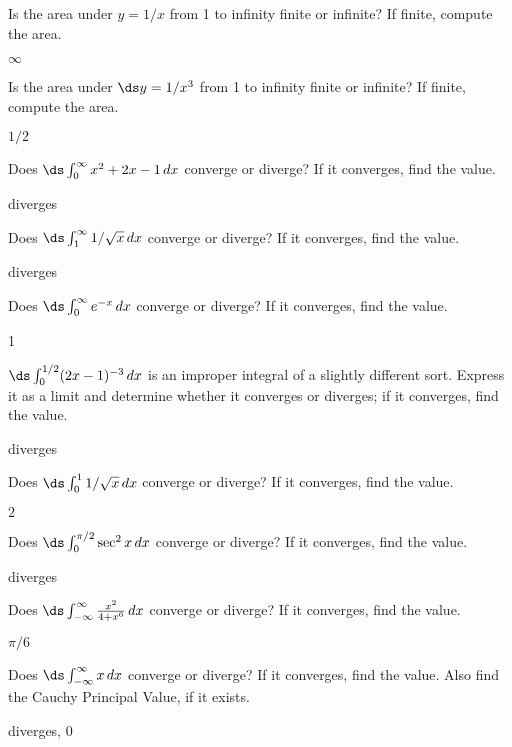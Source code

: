 \begin{exercises}

\exercise Is the area under $y=1/x$ from 1 to infinity finite or
infinite? If finite, compute the area.
\begin{answer} $\infty$
\end{answer}

\exercise Is the area under $\ds y=1/x^3$ from 1 to infinity finite or
infinite? If finite, compute the area.
\begin{answer} $1/2$
\end{answer}

\exercise Does $\ds\int_0^\infty x^2+2x-1\,dx$ converge or diverge? If
it converges, find the value.
\begin{answer} diverges 
\end{answer}

\exercise Does $\ds\int_1^\infty 1/\sqrt{x}\,dx$ converge or diverge? If
it converges, find the value.
\begin{answer} diverges
\end{answer}

\exercise Does $\ds\int_0^\infty e^{-x }\,dx$ converge or diverge? If
it converges, find the value.
\begin{answer} 1
\end{answer}

\exercise $\ds\int_0^{1/2} (2x-1)^{-3}\,dx$ is an improper integral of
a slightly different sort. Express it as a limit and determine whether
it converges or diverges; if 
it converges, find the value.
\begin{answer} diverges
\end{answer}

\exercise Does $\ds\int_0^1 1/\sqrt{x}\,dx$ converge or diverge? If
it converges, find the value.
\begin{answer} $2$
\end{answer}

\exercise Does $\ds\int_0^{\pi/2} \sec^2x\,dx$ converge or diverge? If
it converges, find the value.
\begin{answer} diverges
\end{answer}

\exercise Does $\ds\int_{-\infty}^\infty{x^2\over 4+x^6}\,dx$ 
converge or diverge? If
it converges, find the value.
\begin{answer} $\pi/6$
\end{answer}

\exercise Does $\ds\int_{-\infty}^\infty x\,dx$ 
converge or diverge? If
it converges, find the value. Also find the Cauchy Principal Value, if
it exists.
\begin{answer} diverges, $0$
\end{answer}


\end{exercises}
